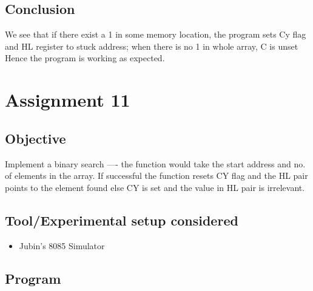 \documentclass[a4paper]{article} %
\begin{document}
    \subsection{Conclusion}
        We see that if there exist a 1 in some memory location, the program sets Cy flag and HL register to stuck address; when there is no 1 in whole array, C is unset\\
        Hence the program is working as expected.
\newpage

\section[Binary Search]{Assignment 11} %
    \subsection{Objective}
        Implement a binary search ---- the function would take the start address and no. of elements in the array. If successful the function resets CY flag and the HL pair points to the element found else CY is set and the value in HL pair is irrelevant. 
    \subsection{Tool/Experimental setup considered}
        \begin{itemize}
            \item Jubin's 8085 Simulator
        \end{itemize}
    \subsection{Program}
        
        \newpage
\end{document}

